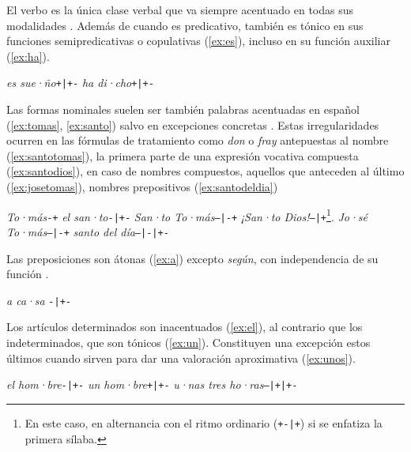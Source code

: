 El verbo es la única clase verbal que va siempre acentuado en todas sus modalidades \parencite[166]{navarrotomas2004}. Además de cuando es predicativo, también es tónico en sus funciones semipredicativas o copulativas (\ref{ex:es}), incluso en su función auxiliar (\ref{ex:ha}).
\begin{exe}
	\ex\label{ex:es}\textit{es sue·ño}\tab \texttt{+|+-}
	\ex\label{ex:ha}\textit{ha di·cho}\tab \texttt{+|+-} 
\end{exe}

Las formas nominales suelen ser también palabras acentuadas en español (\ref{ex:tomas}, \ref{ex:santo}) salvo en excepciones concretas \parencite[167]{navarrotomas2004}. Estas irregularidades ocurren en las fórmulas de tratamiento como \textit{don} o \textit{fray} antepuestas al nombre (\ref{ex:santotomas}), la primera parte de una expresión vocativa compuesta (\ref{ex:santodios}), en caso de nombres compuestos, aquellos que anteceden al último (\ref{ex:josetomas}), nombres prepositivos (\ref{ex:santodeldia})
\begin{exe}
	\ex\label{ex:tomas} \textit{To·más}\tab \texttt{-+}
	\ex\label{ex:santo} \textit{el san·to}\tab  \texttt{-|+-}
	\ex \textit{San·to To·más}\tab  \texttt{--|-+}\label{ex:santotomas}
		\ex\label{ex:santodios} \textit{¡San·to Dios!}\tab \texttt{--|+}\footnote{En este caso, en alternancia con el ritmo ordinario (\texttt{+-|+}) si se enfatiza la primera sílaba.}.
	\ex \textit{Jo·sé To·más}\tab  \texttt{--|-+}\label{ex:josetomas}
	\ex \textit{santo del día}\tab \texttt{--|-|+-}\label{ex:santodeldia}
\end{exe}

Las preposiciones son átonas (\ref{ex:a}) excepto \textit{según}, con independencia de su función \parencite[170]{navarrotomas2004}. 
\begin{exe}
	\ex\label{ex:a} \textit{a ca·sa} \tab \texttt{-|+-}
\end{exe}

Los artículos determinados son inacentuados (\ref{ex:el}), al contrario que los indeterminados, que son tónicos (\ref{ex:un}). Constituyen una excepción estos últimos  \parencite[170]{navarrotomas2004} cuando sirven para dar una valoración aproximativa (\ref{ex:unos}).
\begin{exe}
	\ex\label{ex:el}\textit{el hom·bre}\tab \texttt{-|+-}
	\ex\label{ex:un}\textit{un hom·bre}\tab \texttt{+|+-}
	\ex\label{ex:unos}\textit{u·nas tres ho·ras}\tab \texttt{--|+|+-}
\end{exe}

